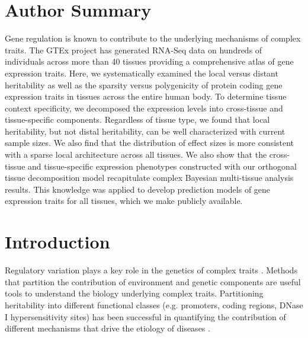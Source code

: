 \documentclass[10pt,letterpaper]{article}
\begin{document}
\section*{Author Summary} %
Gene regulation is known to contribute to the underlying mechanisms of complex traits. The GTEx project has generated RNA-Seq data on hundreds of individuals across more than 40 tissues providing a comprehensive atlas of gene expression traits. Here, we systematically examined the local versus distant heritability as well as the sparsity versus polygenicity of protein coding gene expression traits in tissues across the entire human body. To determine tissue context specificity, we decomposed the expression levels into cross-tissue and tissue-specific components. Regardless of tissue type, we found that local heritability, but not distal heritability, can be well characterized with current sample sizes. We also find that the distribution of effect sizes is more consistent with a sparse local architecture across all tissues. We also show that the cross-tissue and tissue-specific expression phenotypes constructed with our orthogonal tissue decomposition model recapitulate complex Bayesian multi-tissue analysis results. This knowledge was applied to develop prediction models of gene expression traits for all tissues, which we make publicly available.

\linenumbers


\section*{Introduction}
Regulatory variation plays a key role in the genetics of complex traits \cite{Nicolae_2010, Nica_2010, Gusev_2014}. Methods that partition the contribution of environment and genetic components are useful tools to understand the biology underlying complex traits. Partitioning heritability into different functional classes (e.g. promoters, coding regions, DNase I hypersensitivity sites) has been successful in quantifying the contribution of different mechanisms that drive the etiology of diseases \cite{Gusev_2014,torres2014cross,davis2013partitioning}.
\end{document}
